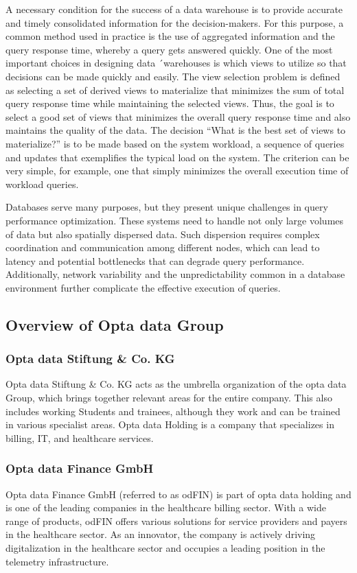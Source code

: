 A necessary condition for the success of a data warehouse is to provide accurate and timely consolidated information for the decision-makers. For this purpose, a common method used in practice is the use of aggregated information and the query response time, whereby a query gets answered quickly. One of the most important choices in designing data ´warehouses is which views to utilize so that decisions can be made quickly and easily. The view selection problem is defined as selecting a set of derived views to materialize that minimizes the sum of total query response time while maintaining the selected views. Thus, the goal is to select a good set of views that minimizes the overall query response time and also maintains the quality of the data. The decision ``What is the best set of views to materialize?'' is to be made based on the system workload, a sequence of queries and updates that exemplifies the typical load on the system. The criterion can be very simple, for example, one that simply minimizes the overall execution time of workload queries\cite{Academia-Juan-ale-2014,Kardel_Thakare}.\vspace{.4cm}


Databases serve many purposes, but they present unique challenges in query performance optimization. These systems need to handle not only large volumes of data but also spatially dispersed data. Such dispersion requires complex coordination and communication among different nodes, which can lead to latency and potential bottlenecks that can degrade query performance. Additionally, network variability and the unpredictability common in a database environment further complicate the effective execution of queries.

\subsection{Overview of Opta data Group}
\subsubsection{Opta data Stiftung \& Co. KG }
Opta data Stiftung \& Co. KG acts as the umbrella organization of the opta data Group, which brings together relevant areas for the entire company. This also includes working Students and trainees, although they work and can be trained in various specialist areas. Opta data Holding is a company that specializes in billing, IT, and healthcare services.

\subsubsection{Opta data Finance GmbH  }
Opta data Finance GmbH (referred to as odFIN) is part of opta data holding and is one of the leading companies in the healthcare billing sector. With a wide range of products, odFIN offers various solutions for service providers and payers in the healthcare sector. As an innovator, the company is actively driving digitalization in the healthcare sector and occupies a leading position in the telemetry infrastructure.

